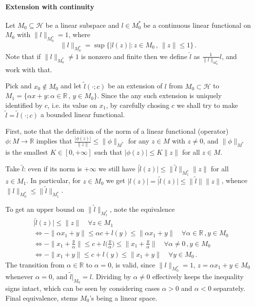 \documentclass[a4paper]{article}
\newcommand{\Hcal}{\mathcal{H}}
\newcommand{\real}{\mathbb{R}}
\begin{document}

\paragraph{Extension with continuity} %
\label{par:extension_with_continuity}

Let $M_0 \subseteq \Hcal$ be a linear subspace and $l\in M_0^*$ be a continuous
linear functional on $M_0$ with $\|l\|_{M_0^*} = 1$, where
\begin{equation*}
  \|l\|_{M_0^*}
    = \sup\bigl\{\lvert l(z) \rvert\colon
        z\in M_0\,,
        \,\|z\|\leq 1
      \bigr\}
    \,.
\end{equation*}
Note that if $\|l\|_{M_0^*} \neq 1$ is nonzero and finite then we define $\hat{l}$
as $\tfrac1{\|l\|_{M_0^*}} l$, and work with that.

Pick and $x_0\notin M_0$ and let $\tilde{l}(\cdot; c)$ be an extension of $l$ from
$M_0\subset \Hcal$ to $M_1 = \{\alpha x + y \colon \alpha \in \real\,,\, y \in M_0\}$.
Since the any such extension is uniquely identified by $c$, i.e. its value on $x_1$,
by carefully chosing $c$ we shall try to make $\tilde{l} = \tilde{l}(\cdot; c)$ a
bounded linear functional.

First, note that the definition of the norm of a linear functional (operator) $\phi
\colon M\to \real$ implies that $\tfrac{\lvert \phi(z) \rvert}{\|z\|} \leq \|\phi\|_{M^*}$
for any $z\in M$ with $z \neq 0$, and $\|\phi\|_{M^*}$ is the smallest $K\in [0,
+\infty]$ such that $\lvert \phi(z) \rvert \leq K \|z\|$ for all $z\in M$.

Take $\tilde{l}$: even if its norm is $+\infty$ we still have $\lvert \tilde{l}(z)\rvert
\leq \|\tilde{l}\|_{M_1^*} \|z\|$ for all $z\in M_1$. In particular, for $z\in M_0$
we get $\lvert l(z)\rvert = \lvert \tilde{l}(z)\rvert \leq \|\tilde{l}\| \|z\|$,
whence $\|l\|_{M_0^*} \leq \|\tilde{l}\|_{M_1^*}$.

To get an upper bound on $\|\tilde{l}\|_{M_1^*}$, note the equivalence
\begin{align*}
  &\lvert \tilde{l}(z) \rvert \leq \|z\|
      \quad \forall z \in M_1
  \\ &\Leftrightarrow
    - \|\alpha x_1 + y\|
      \leq \alpha c + l(y)
      \leq \|\alpha x_1 + y\|
      \quad \forall \alpha \in \real\,, y \in M_0
  \\ &\Leftrightarrow
    - \bigl\|x_1 + \tfrac{y}\alpha\bigr\|
      \leq c + l\bigl(\tfrac{y}\alpha\bigr) \leq
        \bigl\|x_1 + \tfrac{y}\alpha\bigr\|
      \quad \forall \alpha \neq 0\,, y \in M_0
  \\ &\Leftrightarrow
    - \|x_1 + y\| \leq c + l(y) \leq \|x_1 + y\|
      \quad \forall y \in M_0
    \,.
\end{align*}
The transition from $\alpha \in \real$ to $\alpha = 0$, is valid, since $\|l\|_{M_0^*}
= 1$, $z = \alpha x_1 + y \in M_0$ whenever $\alpha = 0$, and $\tilde{l}\big\vert_{M_0}
= l$. Dividing by $\alpha \neq 0$ effectively keeps the inequality signs intact, which
can be seen by considering cases $\alpha > 0$ and $\alpha < 0$ separately. Final
equivalence, stems $M_0$'s being a linear space.
\end{document}
